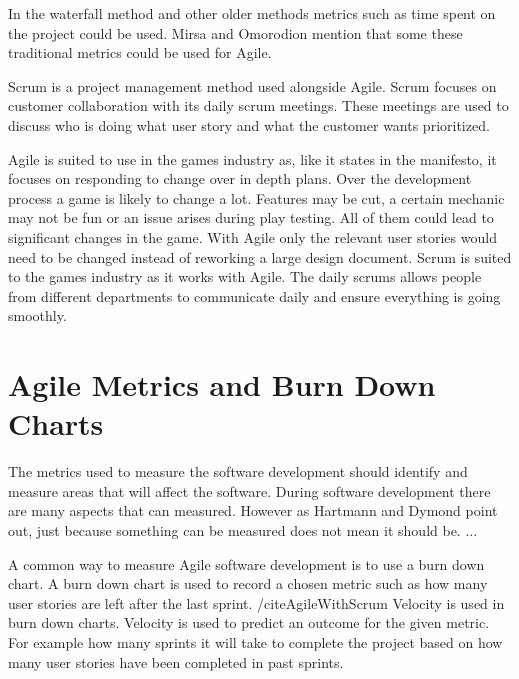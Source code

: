 \documentclass{scrartcl}
\begin{document}
In the waterfall method and other older methods metrics such as time spent on the project could be used. Mirsa and Omorodion mention that some these traditional metrics could be used for Agile.\cite{Misra}

Scrum is a project management method used alongside Agile. Scrum focuses on customer collaboration with its daily scrum meetings. These meetings are used to discuss who is doing what user story and what the customer wants prioritized.

Agile is suited to use in the games industry as, like it states in the manifesto, it focuses on responding to change over in depth plans. Over the development process a game is likely to change a lot. Features may be cut, a certain mechanic may not be fun or an issue arises during play testing. All of them could lead to significant changes in the game. With Agile only the relevant user stories would need to be changed instead of reworking a large design document. Scrum is suited to the games industry as it works with Agile. The daily scrums allows people from different departments to communicate daily and ensure everything is going smoothly. 


\section{Agile Metrics and Burn Down Charts}

The metrics used to measure the software development should identify and measure areas that will affect the software.  \cite{Misra}
During software development there are many aspects that can measured. However as Hartmann and Dymond point out, just because something can be measured does not mean it should be. ... \cite{Hartmann}

A common way to measure Agile software development is to use a burn down chart. A burn down chart is used to record a chosen metric such as how many user stories are left after the last sprint. /cite{AgileWithScrum} Velocity is used in burn down charts. Velocity is used to predict an outcome for the given metric. For example how many sprints it will take to complete the project based on how many user stories have been completed in past sprints.
\end{document}
